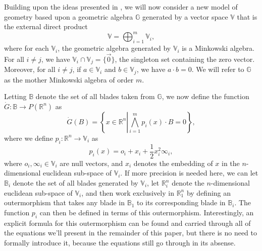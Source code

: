 \documentclass{ecgd-l}
\theoremstyle{definition}
\theoremstyle{remark}
\numberwithin{equation}{section}
\newcommand{\R}{\mathbb{R}}
\newcommand{\B}{\mathbb{B}}
\newcommand{\G}{\mathbb{G}}
\newcommand{\V}{\mathbb{V}}
\newcommand{\Gd}{\dot{G}}
\newcommand{\nvai}{\infty}
\newcommand{\nvao}{o}
\begin{document}
Building upon the ideas presented in \cite{}, we will now consider
a new model of geometry based upon a geometric algebra $\G$
generated by a vector space $\V$ that is the external direct product
\begin{equation*}
\V = \bigoplus_{i=1}^m \V_i,
\end{equation*}
where for each $\V_i$, the geometric algebra generated by $\V_i$
is a Minkowski algebra.  For all $i\neq j$, we have $\V_i\cap\V_j=\{\vec{0}\}$,
the singleton set containing the zero vector. Moreover, for all $i\neq j$, if $a\in\V_i$
and $b\in\V_j$, we have $a\cdot b=0$.  We will refer to $\G$ as the mother Minkowski
algebra of order $m$.

Letting $\B$ denote the set
of all blades taken from $\G$, we now define the function $\Gd:\B\to P(\R^n)$ as
\begin{equation}\label{equ_Gd}
\Gd(B) = \left\{x\in\R^n\left|\bigwedge_{i=1}^m p_i(x)\cdot B=0\right\}\right.,
\end{equation}
where we define $p_i:\R^n\to\V_i$ as
\begin{equation}\label{equ_p_i}
p_i(x) = \nvao_i + x_i + \frac{1}{2}x_i^2\nvai_i,
\end{equation}
where $\nvao_i,\nvai_i\in\V_i$ are null vectors, and $x_i$ denotes the embedding
of $x$ in the $n$-dimensional euclidean sub-space of $\V_i$.  If more precision is needed here,
we can let $\B_i$ denote the set of all blades generated by $\V_i$,
let $\R_i^n$ denote the $n$-dimensional euclidean sub-space of $\V_i$, and then
work exclusively in $\R_1^n$ by defining an outermorphism that takes any blade in $\B_1$
to its corresponding blade in $\B_i$.  The function $p_i$ can then be defined in terms
of this outermorphism.  Interestingly, an explicit formula for this outermorphism can be found and carried through
all of the equations we'll present in the remainder of this paper, but there is no need to
formally introduce it, because the equations still go through in its absense.

\end{document}
